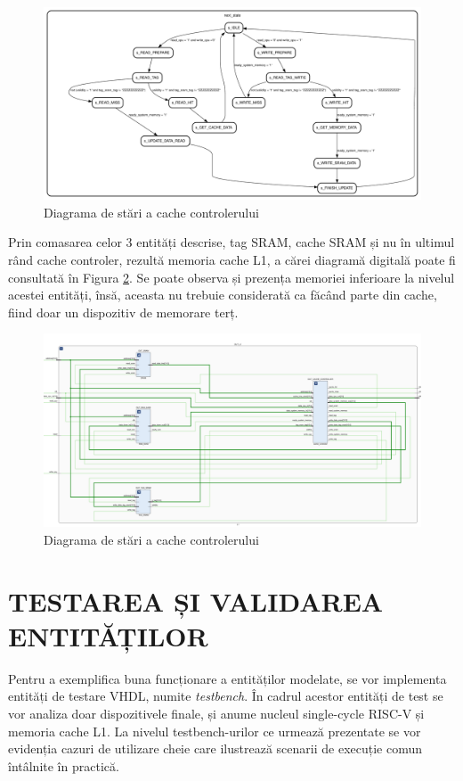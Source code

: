 \documentclass[12pt]{article}
\begin{document}
\newpage
  \begin{figure}[h!]
 \hspace*{-0.48cm}\includegraphics[width=1.1\textwidth]{cachefsm_0.pdf}
 \centering
 \caption{Diagrama de stări a cache controlerului}
 \label{Figura:63}
 \end{figure}
 
Prin comasarea celor 3 entități descrise, tag SRAM, cache SRAM și nu în ultimul rând cache controler, rezultă memoria cache L1, a cărei diagramă digitală poate fi consultată în Figura \ref{Figura:64}. Se poate observa și prezența memoriei inferioare la nivelul acestei entități, însă, aceasta nu trebuie considerată ca făcând parte din cache, fiind doar un dispozitiv de memorare terț.

  \begin{figure}[h!]
 \hspace*{-0.6cm}\includegraphics[width=1.1\textwidth]{cachel1.png}
 \centering
 \caption{Diagrama de stări a cache controlerului}
 \label{Figura:64}
 \end{figure}


\section{\centering TESTAREA ȘI VALIDAREA ENTITĂȚILOR} 
Pentru a exemplifica buna funcționare a entităților modelate, se vor implementa entități de testare VHDL, numite \textit{testbench}. În cadrul acestor entități de test se vor analiza doar dispozitivele finale, și anume nucleul single-cycle RISC-V și memoria cache L1. 
La nivelul testbench-urilor ce urmează prezentate se vor evidenția cazuri de utilizare cheie care ilustrează scenarii de execuție comun întâlnite în practică.
\end{document}
